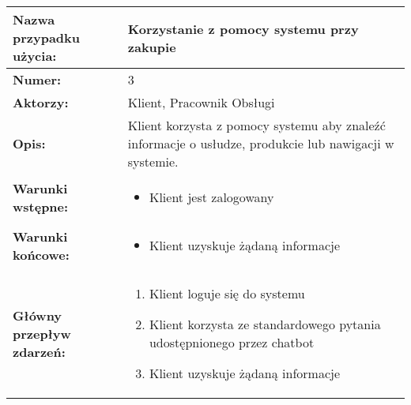 \documentclass[a4paper,20pt]{article}
\begin{document}
\begin{center}
\begin{tabularx}{\textwidth}[t]{XX}

\arrayrulecolor{black}\hline
\textbf{Nazwa przypadku użycia:} & \textbf{Korzystanie z pomocy systemu przy zakupie} \\
\hline

\quad \textbf{Numer:} & 
\begin{minipage}[t]{\linewidth}%
3
\end{minipage}\\


\quad \textbf{Aktorzy:} & 
\begin{minipage}[t]{\linewidth}%
Klient, Pracownik Obsługi
\end{minipage}\\


\quad \textbf{Opis:} & 
\begin{minipage}[t]{\linewidth}%
Klient korzysta z pomocy systemu aby znaleźć informacje o usłudze, produkcie lub nawigacji w systemie.
\end{minipage}\\


\quad \textbf{Warunki wstępne:} & 
\begin{minipage}[t]{\linewidth}%
\begin{itemize}
\item Klient jest zalogowany
\end{itemize}
\end{minipage}\\


\quad \textbf{Warunki końcowe:} & 
\begin{minipage}[t]{\linewidth}%
\begin{itemize}
\item Klient uzyskuje żądaną informacje
\end{itemize}
\end{minipage}\\

\quad \textbf{Główny przepływ zdarzeń:} & 
\begin{minipage}[t]{\linewidth}%
\begin{enumerate}
\item Klient loguje się do systemu
\item Klient korzysta ze standardowego pytania udostępnionego przez chatbot
\item Klient uzyskuje żądaną informacje
\end{enumerate}
\end{minipage}\\



\end{tabularx}
\end{center}
\end{document}
